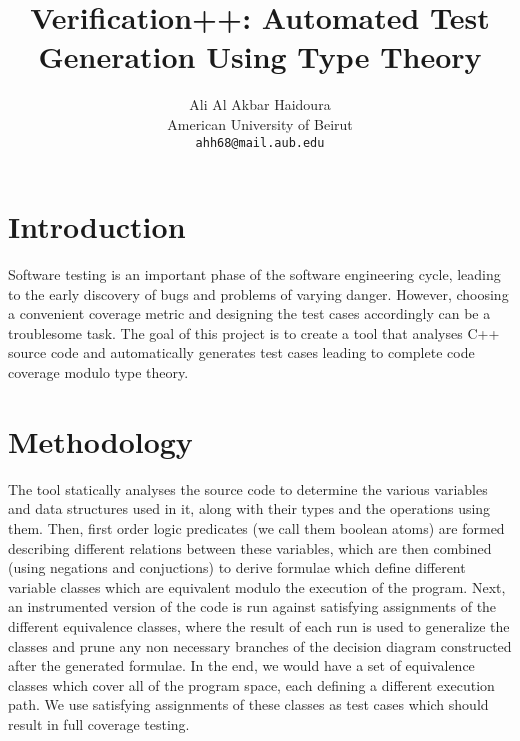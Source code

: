 \documentclass[12pt]{article}
\title{Verification++: Automated Test Generation Using Type Theory}
\author{Ali Al Akbar Haidoura\\
  \small{American University of Beirut}\\
  \small{\texttt{ahh68@mail.aub.edu}}
}
\date{}
\begin{document}
\maketitle

\section{Introduction}
Software testing is an important phase of the software engineering cycle, leading to the early discovery of bugs and problems of varying danger. However, choosing a convenient coverage metric and designing the test cases accordingly can be a troublesome task. The goal of this project is to create a tool that analyses C++ source code and automatically generates test cases leading to complete code coverage modulo type theory.

\section{Methodology}
The tool statically analyses the source code to determine the various variables and data structures used in it, along with their types and the operations using them. Then, first order logic predicates (we call them boolean atoms) are formed describing different relations between these variables, which are then combined (using negations and conjuctions) to derive formulae which define different variable classes which are equivalent modulo the execution of the program. Next, an instrumented version of the code is run against satisfying assignments of the different equivalence classes, where the result of each run is used to generalize the classes and prune any non necessary branches of the decision diagram constructed after the generated formulae. In the end, we would have a set of equivalence classes which cover all of the program space, each defining a different execution path. We use satisfying assignments of these classes as test cases which should result in full coverage testing.
\end{document}
